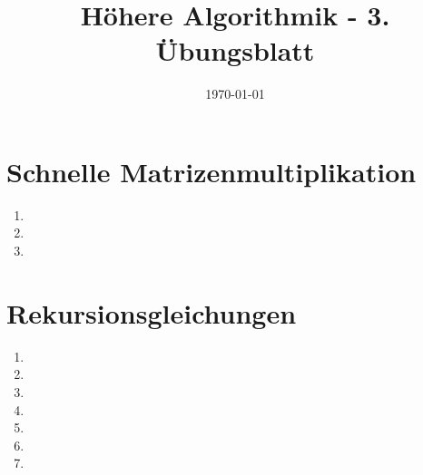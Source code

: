 \documentclass[a4paper,10pt]{scrartcl}
\title{H\"ohere Algorithmik - 3. \"Ubungsblatt}
\author{\Authors}
\date{\today}
\begin{document}
\maketitle

\section{Schnelle Matrizenmultiplikation}
\begin{enumerate}
\item   
\item   
\item   
\end{enumerate}


\section{Rekursionsgleichungen}
\begin{enumerate}
\item   
\item   
\item   
\item   
\item   
\item   
\item   
\end{enumerate}
\end{document}
